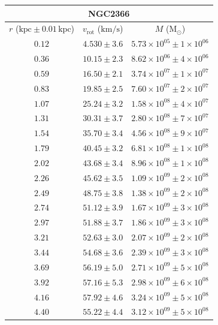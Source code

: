 \documentclass{article}
\newcommand\solmass{\textrm{M}_\odot}
\newcommand\kpc{\textrm{kpc}}
\newcommand\kmps{\textrm{km}/\textrm{s}}
\newcommand\vrot{\ensuremath{v_{\textrm{rot}}}}
\begin{document}
\begin{table}[h!]
    \begin{tabular}{|c|c|c|}
        \hline
        \multicolumn{3}{|c|}{NGC2366} \\
        \hline
        $r$ ($\kpc \pm 0.01 \,\kpc$) & $\vrot$ ($\kmps$) & $M$ ($\solmass$) \\
        \hline
        $0.12$ & $4.530 \pm 3.6$ & $5.73\times 10^{05} \pm 1\times 10^{06}$ \\
        $0.36$ & $10.15 \pm 2.3$ & $8.62\times 10^{06} \pm 4\times 10^{06}$ \\
        $0.59$ & $16.50 \pm 2.1$ & $3.74\times 10^{07} \pm 1\times 10^{07}$ \\
        $0.83$ & $19.85 \pm 2.5$ & $7.60\times 10^{07} \pm 2\times 10^{07}$ \\
        $1.07$ & $25.24 \pm 3.2$ & $1.58\times 10^{08} \pm 4\times 10^{07}$ \\
        $1.31$ & $30.31 \pm 3.7$ & $2.80\times 10^{08} \pm 7\times 10^{07}$ \\
        $1.54$ & $35.70 \pm 3.4$ & $4.56\times 10^{08} \pm 9\times 10^{07}$ \\
        $1.79$ & $40.45 \pm 3.2$ & $6.81\times 10^{08} \pm 1\times 10^{08}$ \\
        $2.02$ & $43.68 \pm 3.4$ & $8.96\times 10^{08} \pm 1\times 10^{08}$ \\
        $2.26$ & $45.62 \pm 3.5$ & $1.09\times 10^{09} \pm 2\times 10^{08}$ \\
        $2.49$ & $48.75 \pm 3.8$ & $1.38\times 10^{09} \pm 2\times 10^{08}$ \\
        $2.74$ & $51.12 \pm 3.9$ & $1.67\times 10^{09} \pm 3\times 10^{08}$ \\
        $2.97$ & $51.88 \pm 3.7$ & $1.86\times 10^{09} \pm 3\times 10^{08}$ \\
        $3.21$ & $52.63 \pm 3.0$ & $2.07\times 10^{09} \pm 2\times 10^{08}$ \\
        $3.44$ & $54.68 \pm 3.6$ & $2.39\times 10^{09} \pm 3\times 10^{08}$ \\
        $3.69$ & $56.19 \pm 5.0$ & $2.71\times 10^{09} \pm 5\times 10^{08}$ \\
        $3.92$ & $57.16 \pm 5.3$ & $2.98\times 10^{09} \pm 6\times 10^{08}$ \\
        $4.16$ & $57.92 \pm 4.6$ & $3.24\times 10^{09} \pm 5\times 10^{08}$ \\
        $4.40$ & $55.22 \pm 4.4$ & $3.12\times 10^{09} \pm 5\times 10^{08}$ \\

\end{tabular}
\end{table}
\end{document}
